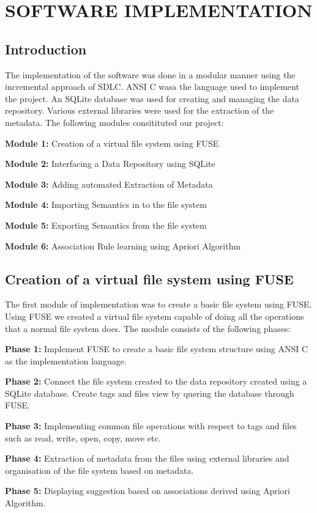 \chapter{SOFTWARE IMPLEMENTATION}
\section{Introduction}
The implementation of the software was done in a modular manner using the incremental approach of SDLC. ANSI C wasa the language used to implement the project. An SQLite database was used for creating and managing the data repository. Various external libraries were used for the extraction of the metadata. The following modules consitituted our project:
\begin{list}{•}{•}
\item \textbf{Module 1:} Creation of a virtual file system using FUSE
\item \textbf{Module 2:} Interfacing a Data Repository using SQLite
\item \textbf{Module 3:} Adding automated Extraction of Metadata 
\item \textbf{Module 4:} Importing Semantics in to the file system
\item \textbf{Module 5:} Exporting Semantics from the file system
\item \textbf{Module 6:} Association Rule learning using Apriori Algorithm
\end{list}

\section{Creation of a virtual file system using FUSE}

The first module of implementation was to create a basic file system using FUSE. Using FUSE we created a virtual file system capable of doing all the operations that a normal file system does.
The module consists of the following phases:
\begin{list}{•}{•}

\item \textbf{Phase 1:} Implement FUSE to create a basic file system structure using ANSI C as the implementation language.

\item \textbf{Phase 2:} Connect the file system created to the data repository created using a SQLite database. Create tags and files view by quering the database through FUSE.

\item \textbf{Phase 3:} Implementing common file operations with respect to tags and files such as read, write, open, copy, move etc.

\item \textbf{Phase 4:} Extraction of metadata from the files using external libraries and organisation of the file system based on metadata.

\item \textbf{Phase 5:} Displaying suggestion based on associations derived using Apriori Algorithm. 
\end{list}


